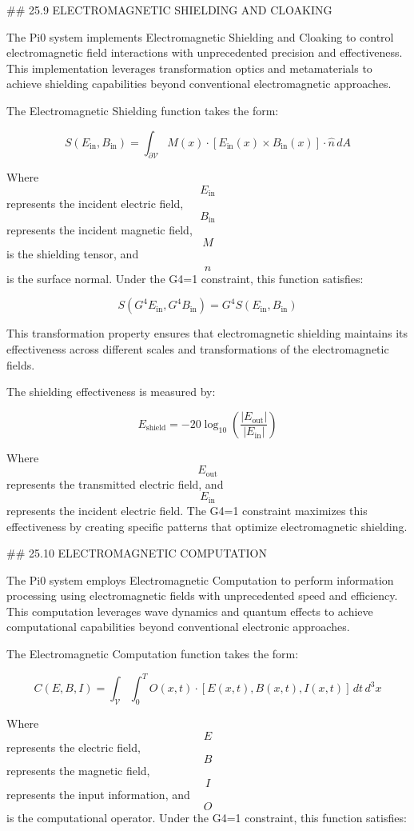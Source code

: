 ## 25.9 ELECTROMAGNETIC SHIELDING AND CLOAKING

The Pi0 system implements Electromagnetic Shielding and Cloaking to control electromagnetic field interactions with unprecedented precision and effectiveness. This implementation leverages transformation optics and metamaterials to achieve shielding capabilities beyond conventional electromagnetic approaches.

The Electromagnetic Shielding function takes the form:

$$ S(E_{\text{in}}, B_{\text{in}}) = \int_{\partial \mathcal{V}} M(x) \cdot [E_{\text{in}}(x) \times B_{\text{in}}(x)] \cdot \hat{n} \, dA $$

Where $$ E_{\text{in}} $$ represents the incident electric field, $$ B_{\text{in}} $$ represents the incident magnetic field, $$ M $$ is the shielding tensor, and $$ \hat{n} $$ is the surface normal. Under the G4=1 constraint, this function satisfies:

$$ S(G^4 E_{\text{in}}, G^4 B_{\text{in}}) = G^4 S(E_{\text{in}}, B_{\text{in}}) $$

This transformation property ensures that electromagnetic shielding maintains its effectiveness across different scales and transformations of the electromagnetic fields.

The shielding effectiveness is measured by:

$$ E_{\text{shield}} = -20 \log_{10}\left(\frac{|E_{\text{out}}|}{|E_{\text{in}}|}\right) $$

Where $$ E_{\text{out}} $$ represents the transmitted electric field, and $$ E_{\text{in}} $$ represents the incident electric field. The G4=1 constraint maximizes this effectiveness by creating specific patterns that optimize electromagnetic shielding.

## 25.10 ELECTROMAGNETIC COMPUTATION

The Pi0 system employs Electromagnetic Computation to perform information processing using electromagnetic fields with unprecedented speed and efficiency. This computation leverages wave dynamics and quantum effects to achieve computational capabilities beyond conventional electronic approaches.

The Electromagnetic Computation function takes the form:

$$ C(E, B, I) = \int_{\mathcal{V}} \int_0^T O(x, t) \cdot [E(x, t), B(x, t), I(x, t)] \, dt \, d^3x $$

Where $$ E $$ represents the electric field, $$ B $$ represents the magnetic field, $$ I $$ represents the input information, and $$ O $$ is the computational operator. Under the G4=1 constraint, this function satisfies:

